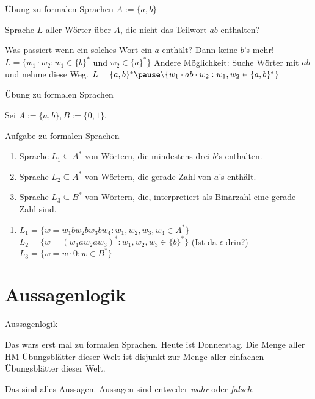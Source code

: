 \documentclass[handout]{beamer}
\begin{document}
\begin{frame}{Übung zu formalen Sprachen}
	$A := \{a, b\}$
	
	\begin{itemize}
		\pitem Sprache $L$ aller Wörter über $A$, die nicht das Teilwort $ab$ enthalten?
		\begin{itemize}
			\pitem Was passiert wenn ein solches Wort ein $a$ enthält? \pause Dann keine $b$'s mehr!
			\pitem $L = \{w_1 \cdot w_2 : w_1 \in \{b\}^*$ und $w_2 \in \{a\}^* \}$
			\pitem Andere Möglichkeit\pause : Suche Wörter mit $ab$ und nehme diese Weg.
			\pitem $L = \{a, b\}^*\pause \backslash\{ w_1 \cdot ab \cdot w_2 : w_1, w_2 \in \{a,b\}^* \}$
		\end{itemize}
	\end{itemize}
\end{frame}

\begin{frame}{Übung zu formalen Sprachen}
	
	Sei $A := \{a, b\}, B := \{0, 1\}$.
	
	\begin{taskblock}{Aufgabe zu formalen Sprachen}
		\begin{enumerate}
			\item Sprache $L_1 \subseteq A^*$ von Wörtern, die mindestens drei $b$'s enthalten.
			\item Sprache $L_2 \subseteq A^*$ von Wörtern, die gerade Zahl von $a$'s enthält.
			\item Sprache $L_3 \subseteq B^*$ von Wörtern, die, interpretiert als Binärzahl eine gerade Zahl sind.
		\end{enumerate}
	\end{taskblock}

	\pause
	
	\begin{enumerate}
		\item $L_1 = \{w = w_1  b  w_2  b  w_3 b w_4 : w_1,w_2,w_3,w_4 \in A^* \}$
		\pitem $L_2 = \{w = (w_1 a w_2 a w_3)^* : w_1,w_2,w_3 \in \{b\}^* \}$ \pause (Ist da $\epsilon$ drin?)
		\pitem $L_3 = \{w = w \cdot 0 : w \in B^* \}$
	\end{enumerate}
\end{frame}

\section{Aussagenlogik}

\begin{frame}{Aussagenlogik}
	\begin{itemize}
		\pitem Das wars erst mal zu formalen Sprachen.
		\pitem Heute ist Donnerstag.
		\pitem Die Menge aller HM-Übungsblätter dieser Welt ist disjunkt zur Menge aller einfachen Übungsblätter dieser Welt.
	\end{itemize}

	\pause
	
	Das sind alles Aussagen. Aussagen sind entweder \emph{wahr} oder \emph{falsch}.
\end{frame}
\end{document}
